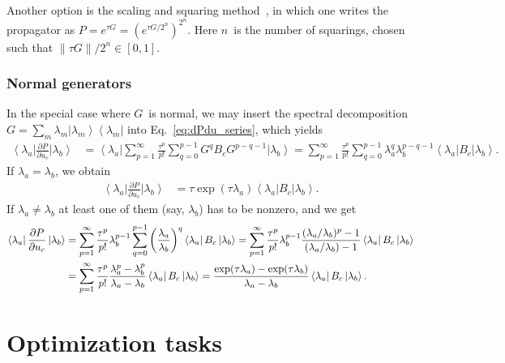 \documentclass[aps, pra, a4paper, longbibliography, superscriptaddress]{revtex4-1}
\newcommand{\ket}[1]{\left| #1 \right \rangle}
\newcommand{\bra}[1]{\left \langle #1 \right|}
\newcommand{\dd}[2]{\frac{\partial #1}{\partial #2}}
\begin{document}
Another option is the scaling and squaring method~\cite{}, in which
one writes the propagator as
$P = e^{\tau G} = \left(e^{\tau G/2^n}\right)^{2^n}$.
Here $n$~is the number of squarings, chosen such that
$\|\tau G\|/2^n \in [0,1]$.


\subsubsection{Normal generators}
\label{sec:dPdu_normal}

In the special case where $G$~is normal, we may insert the spectral decomposition
$G = \sum_m \lambda_m \ket{\lambda_m} \bra{\lambda_m}$
into Eq.~\eqref{eq:dPdu_series}, which yields
\begin{align}
\bra{\lambda_a} \dd{P}{u_{c}} \ket{\lambda_b}
&=
\bra{\lambda_a} \sum_{p=1}^{\infty} \frac{\tau^p}{p!} \sum_{q=0}^{p-1}
G^{q} B_c G^{p-q-1} \ket{\lambda_b}
=
\sum_{p=1}^{\infty} \frac{\tau^p}{p!} \sum_{q=0}^{p-1}
\lambda_a^{q} \lambda_b^{p-q-1} \bra{\lambda_a} B_c \ket{\lambda_b}.
\end{align}
If $\lambda_a = \lambda_b$, we obtain
\begin{align}
\bra{\lambda_a} \dd{P}{u_{c}} \ket{\lambda_b}
&=
\tau \exp(\tau \lambda_a) \bra{\lambda_a} B_c \ket{\lambda_b}.
\end{align}
If $\lambda_a \neq \lambda_b$ at least one of them (say, $\lambda_b$) has to be nonzero,
and we get
\begin{align}
\notag
\bra{\lambda_a} \dd{P}{u_{c}} \ket{\lambda_b}
&=
\sum_{p=1}^{\infty} \frac{\tau^p}{p!} \lambda_b^{p-1}
\sum_{q=0}^{p-1} \left(\frac{\lambda_a}{\lambda_b}\right)^{q}  \bra{\lambda_a} B_c \ket{\lambda_b}
=
\sum_{p=1}^{\infty} \frac{\tau^p}{p!} \lambda_b^{p-1}
\frac{(\lambda_a/\lambda_b)^p -1}{(\lambda_a/\lambda_b) -1}  \bra{\lambda_a} B_c \ket{\lambda_b}\\
&=
\sum_{p=1}^{\infty} \frac{\tau^p}{p!}
\frac{\lambda_a^p -\lambda_b^p}{\lambda_a -\lambda_b}  \bra{\lambda_a} B_c \ket{\lambda_b}
=
\frac{\exp(\tau \lambda_a) -\exp(\tau \lambda_b)}{\lambda_a -\lambda_b}  \bra{\lambda_a} B_c \ket{\lambda_b}.
\end{align}



\section{Optimization tasks}
\end{document}
